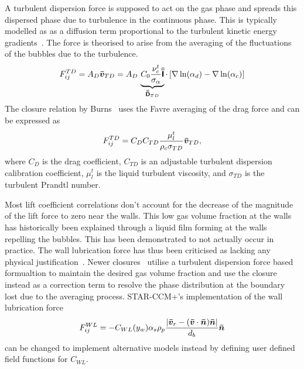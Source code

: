 A turbulent dispersion force is supposed to act on the gas phase and 
 spreads this dispersed phase due to turbulence
 in the continuous phase. This is typically modelled as 
 as a diffusion term proportional to the turbulent 
 kinetic energy gradients~\cite{liaoFlashingEvaporationDifferent2013}. 
 The force is theorised to arise from the averaging of the fluctuations
 of the bubbles due to the turbulence.
 \begin{equation}
   F_{ij}^{TD} = A_{D} \bm{\bar{v}}_{TD}
   = A_{D}\,\underbrace{C_{0} \frac{\nu_{c}^{t}}{\sigma_{\alpha}}{\bm{\bar{\bar{\mathsf{I}}}}}}_{{\bm{\bar{\bar{\mathsf{D}}}}}_{TD}} \cdot 
   \left[
       \nabla \ln(\alpha_{d}) - \nabla \ln(\alpha_{c})
       \right]
 \end{equation}
 The closure relation by Burns~\cite{star-ccm+} uses the Favre averaging of the drag
 force and can be expressed as
 \begin{equation}
   F_{ij}^{TD} = C_{D} C_{TD} \frac{\mu_{l}^{t}}{\rho_{c} \sigma_{TD}}\bm{\bar{v}}_{TD},
 \end{equation}
 where \(C_{D}\) is the drag coefficient, \(C_{TD}\) is an adjustable turbulent dispersion
 calibration coefficient, \(\mu_{l}^{t}\) is the liquid turbulent viscosity, and
 \(\sigma_{TD}\) is the turbulent Prandtl number.

Most lift
 coefficient correlations don't account for the decrease of the magnitude of the
 lift force to zero 
 near the walls. This low gas volume fraction at the walls has historically
 been explained
 through a liquid film forming at the walls repelling the bubbles. This has been demonstrated to
 not actually occur in practice. The wall lubrication force has thus been criticised
 as lacking any physical justification~\cite{sugrueRobustMomentumClosure,colomboBenchmarkingCFDModelling}.
 Newer closures~\cite{sugrueRobustMomentumClosure,star-ccm+} utilise a turbulent dispersion force based 
 formualtion to maintain the desired gas volume fraction and use the closure instead
 as a correction term to resolve the phase distribution at the boundary lost due to
 the averaging process. STAR-CCM+'s implementation of the wall lubrication force
 \begin{equation}
   F_{ij}^{WL} = - C_{WL}(y_{w})\alpha_{s} \rho_{p} 
   \frac{|\bm{\bar{v}}_{r} - (\bm{\bar{v}}\cdot \bm{\bar{n}})\bm{\bar{n}}|}{d_{b}} \bm{\bar{n}}
 \end{equation}
 can be changed to implement alternative models instead by defining user defined 
 field functions for \(C_{WL}\).

